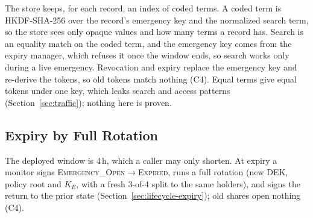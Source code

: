 The store keeps, for each record, an index of coded terms. %
A coded term is HKDF-SHA-256 over the record's emergency key and the
normalized search term, so the store sees only opaque values and how many
terms a record has. %
Search is an equality match on the coded term, and the emergency key comes
from the expiry manager, which refuses it once the window ends, so search
works only during a live emergency. %
Revocation and expiry replace the emergency key and re-derive the tokens, so
old tokens match nothing (C4). %
Equal terms give equal tokens under one key, which leaks search and access
patterns (Section~\ref{sec:traffic}); nothing here is proven. %

\subsection{Expiry by Full Rotation}

The deployed window is 4\,h, which a caller may only shorten.
At expiry a monitor signs \textsc{Emergency\_Open}$\to$\allowbreak\textsc{Expired},
runs a full rotation (new DEK, policy root and $K_E$, with a fresh 3-of-4
split to the same holders), and signs the return to the prior state
(Section~\ref{sec:lifecycle-expiry}); old shares open nothing (C4).
